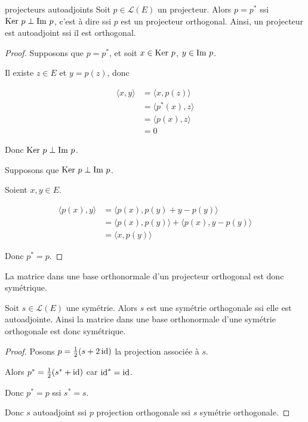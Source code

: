 \begin{proposition}{projecteurs autoadjoints}{}
    Soit $p \in \mathscr L(E)$ un projecteur. Alors $p = p^*$ ssi 
    $\operatorname{Ker} \, p \perp \operatorname{Im} \, p$, c'est à dire ssi $p$ est un projecteur orthogonal. 
    Ainsi, un projecteur est autoadjoint ssi il est orthogonal.
\end{proposition}

\begin{proof}
    Supposons que $p = p^*$, et soit $x \in \operatorname{Ker} \, p$, $y \in \operatorname{Im} \, p$.

    Il existe $z \in E$ et $y = p(z)$, donc 

    \begin{align}
        \langle x, y \rangle & = \langle x, p(z) \rangle \\
        & = \langle p^*(x), z \rangle \\
        & = \langle p(x), z \rangle \\
        & = 0
    \end{align}

    Donc $\operatorname{Ker} \, p \perp \operatorname{Im} \, p$. 

    Supposons que $\operatorname{Ker} \, p \perp \operatorname{Im} \, p$. 

    Soient $x, y \in E$. 

    \begin{align}
        \langle p(x), y \rangle & = \langle p(x), p(y) + y - p(y) \rangle \\
        & = \langle p(x), p(y) \rangle + \langle p(x), y - p(y) \rangle \\
        & = \langle x, p(y) \rangle 
    \end{align}

    Donc $p^* = p$.
\end{proof}

\begin{corollaire}{}{}
    La matrice dans une base orthonormale d'un projecteur orthogonal est donc symétrique.
\end{corollaire}

\begin{corollaire}{}{}
    Soit $s \in \mathscr L(E)$ une symétrie. Alors 
    $s$ est une symétrie orthogonale ssi elle est autoadjointe.
    Ainsi la matrice dans une base orthonormale d'une symétrie orthogonale est donc symétrique.
\end{corollaire}

\begin{proof}
    Posons $p = \frac 1 2 (s + 2 \operatorname{id})$ la projection associée à $s$. 

    Alors $p^* = \frac 1 2(s^* + \operatorname{id})$ car $\operatorname{id}^* = \operatorname{id}$. 

    Donc $p^* = p$ ssi $s^* = s$.

    Donc $s$ autoadjoint ssi $p$ projection orthogonale ssi $s$ symétrie orthogonale. 
\end{proof}

